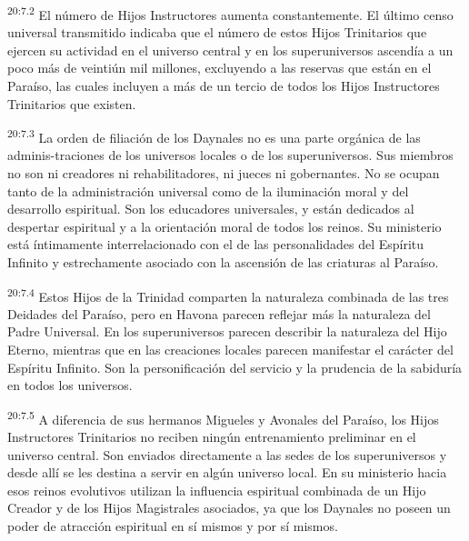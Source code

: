 \par
\textsuperscript{20:7.2} El número de Hijos Instructores aumenta constantemente. El último censo universal transmitido indicaba que el número de estos Hijos Trinitarios que ejercen su actividad en el universo central y en los superuniversos ascendía a un poco más de veintiún mil millones, excluyendo a las reservas que están en el Paraíso, las cuales incluyen a más de un tercio de todos los Hijos Instructores Trinitarios que existen.

\par
\textsuperscript{20:7.3} La orden de filiación de los Daynales no es una parte orgánica de las adminis-traciones de los universos locales o de los superuniversos. Sus miembros no son ni creadores ni rehabilitadores, ni jueces ni gobernantes. No se ocupan tanto de la administración universal como de la iluminación moral y del desarrollo espiritual. Son los educadores universales, y están dedicados al despertar espiritual y a la orientación moral de todos los reinos. Su ministerio está íntimamente interrelacionado con el de las personalidades del Espíritu Infinito y estrechamente asociado con la ascensión de las criaturas al Paraíso.

\par
\textsuperscript{20:7.4} Estos Hijos de la Trinidad comparten la naturaleza combinada de las tres Deidades del Paraíso, pero en Havona parecen reflejar más la naturaleza del Padre Universal. En los superuniversos parecen describir la naturaleza del Hijo Eterno, mientras que en las creaciones locales parecen manifestar el carácter del Espíritu Infinito. Son la personificación del servicio y la prudencia de la sabiduría en todos los universos.

\par
\textsuperscript{20:7.5} A diferencia de sus hermanos Migueles y Avonales del Paraíso, los Hijos Instructores Trinitarios no reciben ningún entrenamiento preliminar en el universo central. Son enviados directamente a las sedes de los superuniversos y desde allí se les destina a servir en algún universo local. En su ministerio hacia esos reinos evolutivos utilizan la influencia espiritual combinada de un Hijo Creador y de los Hijos Magistrales asociados, ya que los Daynales no poseen un poder de atracción espiritual en sí mismos y por sí mismos.

